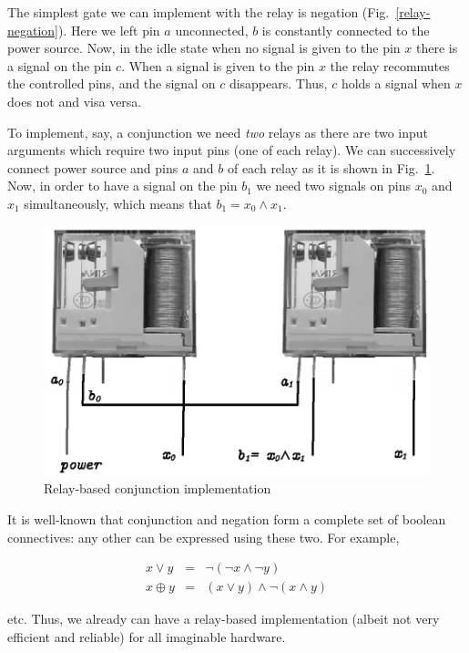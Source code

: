 The simplest gate we can implement with the relay is negation (Fig.~\ref{relay-negation}). Here we left pin $a$ unconnected, $b$ is
constantly connected to the power source. Now, in the idle state when no signal is given to the pin $x$ there is a signal on the
pin $c$. When a signal is given to the pin $x$ the relay recommutes the controlled pins, and the signal on $c$ disappears. Thus,
$c$ holds a signal when $x$ does not and visa versa.

To implement, say, a conjunction we need \emph{two} relays as there are two input arguments which require two input
pins (one of each relay). We can successively connect power source and pins $a$ and $b$ of each relay as it is
shown in Fig.~\ref{relay-conjunction}. Now, in order to have a signal on the pin $b_1$ we need two signals on
pins $x_0$ and $x_1$ simultaneously, which means that $b_1=x_0\wedge x_1$. 

\begin{figure}[t]
  \centering
  \includegraphics{images/06-09.eps}
  \caption{Relay-based conjunction implementation}
  \label{relay-conjunction}
\end{figure}

It is well-known that conjunction and negation form a complete set of boolean connectives: any other can be expressed
using these two. For example,

\[
\begin{array}{rcl}
  x\vee y & = & \neg (\neg x \wedge \neg y) \\
  x\oplus y & = & (x \vee y) \wedge \neg (x \wedge y)
\end{array}
\]

etc. Thus, we already can have a relay-based implementation (albeit not very efficient and reliable) for all imaginable
hardware.


